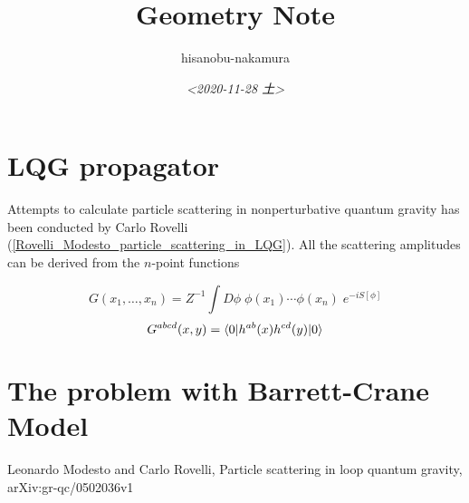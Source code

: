 \documentclass{article}
\author{hisanobu-nakamura}
\date{\textit{<2020-11-28 土>}}
\title{Geometry Note}
\begin{document}
\maketitle
\tableofcontents



\section{LQG propagator}
\label{sec-1}
Attempts to calculate particle scattering in nonperturbative quantum gravity has been conducted by Carlo Rovelli (\ref{Rovelli_Modesto_particle_scattering_in_LQG}). All the scattering amplitudes can be derived from the $n$-point functions

\begin{equation}
\label{}
G(x_1, \ldots,x_n) = Z^{-1} \int D \phi \; \phi (x_1) \cdots \phi(x_n) \; e^{-iS[\phi]}
\end{equation}
\begin{equation}
\label{}
G^{abcd}(x,y) = \langle{0}|h^{ab}(x)h^{cd}(y)|{0}\rangle
\end{equation}

\section{The problem with Barrett-Crane Model}
\label{sec-2}

\begin{thebibliography}{10}
Leonardo Modesto and Carlo Rovelli, Particle scattering in loop quantum gravity, arXiv:gr-qc/0502036v1
\end{thebibliography}
\end{document}
